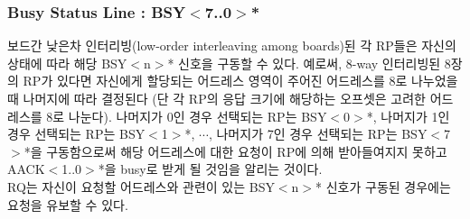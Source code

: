 \subsubsection{Busy Status Line : BSY$<$7..0$>$*}
보드간 낮은차 인터리빙(low-order interleaving among boards)된
각 RP들은 자신의 상태에 따라 해당 BSY$<$n$>$* 신호을 구동할 수 있다.
예로써, 8-way 인터리빙된 8장의 RP가 있다면 자신에게 할당되는 어드레스 영역이
주어진 어드레스를 8로 나누었을때 나머지에 따라 결정된다 (단 각 RP의 응답 크기에
해당하는 오프셋은 고려한 어드레스를 8로 나눈다).
나머지가 0인 경우 선택되는 RP는 BSY$<$0$>$*,
나머지가 1인 경우 선택되는 RP는 BSY$<$1$>$*, $\cdots$,
나머지가 7인 경우 선택되는 RP는 BSY$<$7$>$*을 구동함으로써
해당 어드레스에 대한 요청이 RP에 의해 받아들여지지 못하고 AACK$<$1..0$>$*을
busy로 받게 될 것임을 알리는 것이다. \\
RQ는 자신이 요청할 어드레스와 관련이 있는 BSY$<$n$>$* 신호가
구동된 경우에는 요청을 유보할 수 있다.
%
